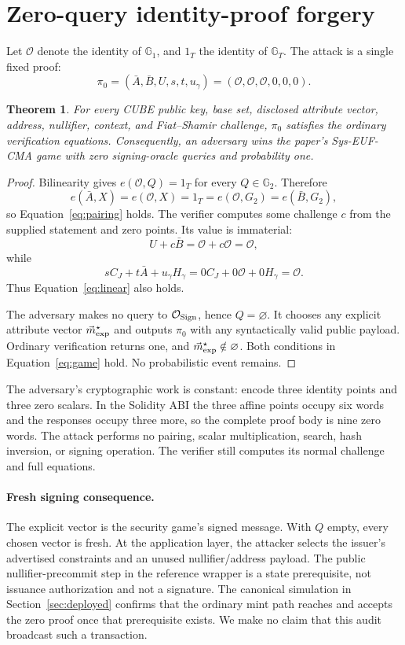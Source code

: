 \documentclass[10pt,a4paper]{article}
\newtheorem{theorem}{Theorem}
\newcommand{\GOne}{\mathbb{G}_1}
\newcommand{\GTwo}{\mathbb{G}_2}
\newcommand{\GT}{\mathbb{G}_T}
\newcommand{\OO}{\mathcal{O}}
\begin{document}
\section{Zero-query identity-proof forgery}

Let $\OO$ denote the identity of $\GOne$, and $1_T$ the identity of $\GT$.
The attack is a single fixed proof:
\begin{equation}
 \pi_0=(\bar A,\bar B,U,s,t,u_\gamma)
      =(\OO,\OO,\OO,0,0,0).                           \label{eq:zero-proof}
\end{equation}

\begin{theorem}\label{thm:forge}
For every CUBE public key, base set, disclosed attribute vector, address,
nullifier, context, and Fiat--Shamir challenge, $\pi_0$ satisfies the ordinary
verification equations. Consequently, an adversary wins the paper's
Sys-EUF-CMA game with zero signing-oracle queries and probability one.
\end{theorem}

\begin{proof}
Bilinearity gives $e(\OO,Q)=1_T$ for every $Q\in\GTwo$. Therefore
\[
 e(\bar A,X)=e(\OO,X)=1_T=e(\OO,G_2)=e(\bar B,G_2),
\]
so Equation~\eqref{eq:pairing} holds. The verifier computes some challenge
$c$ from the supplied statement and zero points. Its value is immaterial:
\[
 U+c\bar B=\OO+c\OO=\OO,
\]
while
\[
 sC_J+t\bar A+u_\gamma H_\gamma
 =0C_J+0\OO+0H_\gamma=\OO.
\]
Thus Equation~\eqref{eq:linear} also holds.

The adversary makes no query to $\mathcal O_{\rm Sign}$, hence $Q=\varnothing$.
It chooses any explicit attribute vector $\vec m_{\rm exp}^\star$ and outputs
$\pi_0$ with any syntactically valid public payload. Ordinary verification
returns one, and
$\vec m_{\rm exp}^\star\notin\varnothing$. Both conditions in
Equation~\eqref{eq:game} hold. No probabilistic event remains.
\end{proof}

The adversary's cryptographic work is constant: encode three identity points
and three zero scalars. In the Solidity ABI the three affine points occupy six
words and the responses occupy three more, so the complete proof body is nine
zero words. The attack performs no pairing, scalar multiplication, search,
hash inversion, or signing operation. The verifier still computes its normal
challenge and full equations.

\paragraph{Fresh signing consequence.}
The explicit vector is the security game's signed message. With $Q$ empty,
every chosen vector is fresh. At the application layer, the attacker selects
the issuer's advertised constraints and an unused nullifier/address payload.
The public nullifier-precommit step in the reference wrapper is a state
prerequisite, not issuance authorization and not a signature. The canonical
simulation in Section~\ref{sec:deployed} confirms that the ordinary mint path
reaches and accepts the zero proof once that prerequisite exists. We make no
claim that this audit broadcast such a transaction.
\end{document}
